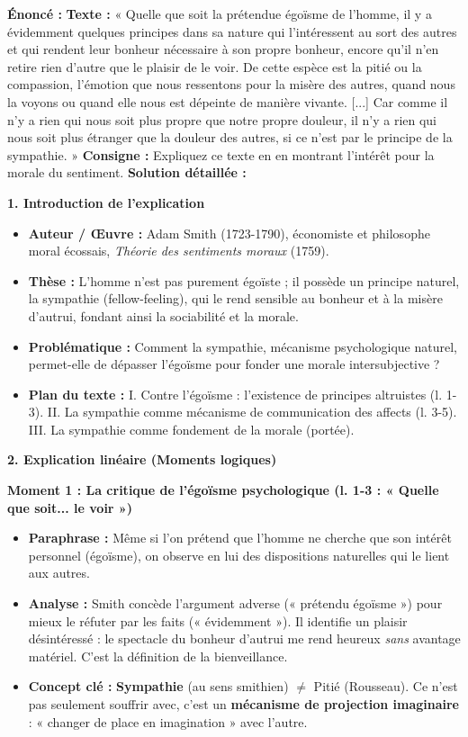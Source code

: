 \documentclass[11pt]{article}
\newcommand{\cle}[1]{{\popxbold\color{popdark}#1}}
\begin{document}
\begin{exoresolu}
\textbf{Énoncé :} \textbf{Texte :} « Quelle que soit la prétendue égoïsme de l'homme, il y a évidemment quelques principes dans sa nature qui l'intéressent au sort des autres et qui rendent leur bonheur nécessaire à son propre bonheur, encore qu'il n'en retire rien d'autre que le plaisir de le voir. De cette espèce est la pitié ou la compassion, l'émotion que nous ressentons pour la misère des autres, quand nous la voyons ou quand elle nous est dépeinte de manière vivante. [...] Car comme il n'y a rien qui nous soit plus propre que notre propre douleur, il n'y a rien qui nous soit plus étranger que la douleur des autres, si ce n'est par le principe de la sympathie. »
\textbf{Consigne :} Expliquez ce texte en en montrant l'intérêt pour la morale du sentiment.
\tcblower
\textbf{Solution détaillée :}

\textbf{1. Introduction de l'explication}
\begin{itemize}
    \item \textbf{Auteur / Œuvre :} Adam Smith (1723-1790), économiste et philosophe moral écossais, \emph{Théorie des sentiments moraux} (1759).
    \item \textbf{Thèse :} L'homme n'est pas purement égoïste ; il possède un principe naturel, la \cle{sympathie} (fellow-feeling), qui le rend sensible au bonheur et à la misère d'autrui, fondant ainsi la sociabilité et la morale.
    \item \textbf{Problématique :} Comment la sympathie, mécanisme psychologique naturel, permet-elle de dépasser l'égoïsme pour fonder une morale intersubjective ?
    \item \textbf{Plan du texte :} I. Contre l'égoïsme : l'existence de principes altruistes (l. 1-3). II. La sympathie comme mécanisme de communication des affects (l. 3-5). III. La sympathie comme fondement de la morale (portée).
\end{itemize}

\textbf{2. Explication linéaire (Moments logiques)}

\textbf{Moment 1 : La critique de l'égoïsme psychologique (l. 1-3 : « Quelle que soit... le voir »)}
\begin{itemize}
    \item \textbf{Paraphrase :} Même si l'on prétend que l'homme ne cherche que son intérêt personnel (égoïsme), on observe en lui des dispositions naturelles qui le lient aux autres.
    \item \textbf{Analyse :} Smith concède l'argument adverse (« prétendu égoïsme ») pour mieux le réfuter par les faits (« évidemment »). Il identifie un \cle{plaisir désintéressé} : le spectacle du bonheur d'autrui me rend heureux \emph{sans} avantage matériel. C'est la définition de la \cle{bienveillance}.
    \item \textbf{Concept clé :} \textbf{Sympathie} (au sens smithien) $\neq$ Pitié (Rousseau). Ce n'est pas seulement souffrir avec, c'est un \textbf{mécanisme de projection imaginaire} : « changer de place en imagination » avec l'autre.
\end{itemize}


\end{exoresolu}
\end{document}

